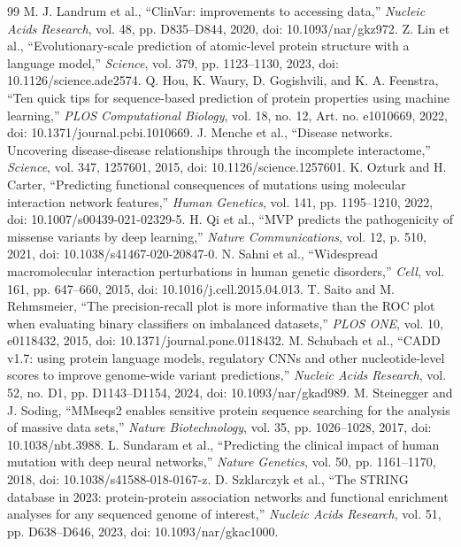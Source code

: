 \documentclass[conference]{IEEEtran}
\begin{document}
\begin{thebibliography}{99}
 M. J. Landrum et al., ``ClinVar: improvements to accessing data,'' \emph{Nucleic Acids Research}, vol. 48, pp. D835--D844, 2020, doi: 10.1093/nar/gkz972.
 Z. Lin et al., ``Evolutionary-scale prediction of atomic-level protein structure with a language model,'' \emph{Science}, vol. 379, pp. 1123--1130, 2023, doi: 10.1126/science.ade2574.
 Q. Hou, K. Waury, D. Gogishvili, and K. A. Feenstra, ``Ten quick tips for sequence-based prediction of protein properties using machine learning,'' \emph{PLOS Computational Biology}, vol. 18, no. 12, Art. no. e1010669, 2022, doi: 10.1371/journal.pcbi.1010669.
 J. Menche et al., ``Disease networks. Uncovering disease-disease relationships through the incomplete interactome,'' \emph{Science}, vol. 347, 1257601, 2015, doi: 10.1126/science.1257601.
 K. Ozturk and H. Carter, ``Predicting functional consequences of mutations using molecular interaction network features,'' \emph{Human Genetics}, vol. 141, pp. 1195--1210, 2022, doi: 10.1007/s00439-021-02329-5.
 H. Qi et al., ``MVP predicts the pathogenicity of missense variants by deep learning,'' \emph{Nature Communications}, vol. 12, p. 510, 2021, doi: 10.1038/s41467-020-20847-0.
 N. Sahni et al., ``Widespread macromolecular interaction perturbations in human genetic disorders,'' \emph{Cell}, vol. 161, pp. 647--660, 2015, doi: 10.1016/j.cell.2015.04.013.
 T. Saito and M. Rehmsmeier, ``The precision-recall plot is more informative than the ROC plot when evaluating binary classifiers on imbalanced datasets,'' \emph{PLOS ONE}, vol. 10, e0118432, 2015, doi: 10.1371/journal.pone.0118432.
 M. Schubach et al., ``CADD v1.7: using protein language models, regulatory CNNs and other nucleotide-level scores to improve genome-wide variant predictions,'' \emph{Nucleic Acids Research}, vol. 52, no. D1, pp. D1143--D1154, 2024, doi: 10.1093/nar/gkad989.
 M. Steinegger and J. Soding, ``MMseqs2 enables sensitive protein sequence searching for the analysis of massive data sets,'' \emph{Nature Biotechnology}, vol. 35, pp. 1026--1028, 2017, doi: 10.1038/nbt.3988.
 L. Sundaram et al., ``Predicting the clinical impact of human mutation with deep neural networks,'' \emph{Nature Genetics}, vol. 50, pp. 1161--1170, 2018, doi: 10.1038/s41588-018-0167-z.
 D. Szklarczyk et al., ``The STRING database in 2023: protein-protein association networks and functional enrichment analyses for any sequenced genome of interest,'' \emph{Nucleic Acids Research}, vol. 51, pp. D638--D646, 2023, doi: 10.1093/nar/gkac1000.

\end{thebibliography}
\end{document}
